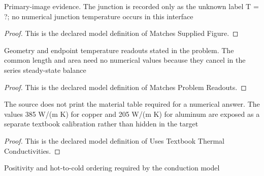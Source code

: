 \begin{definition}
  \label{def:physics:phyx-mini-0488:phyxminiproblems-problemphyxmini0488-matchessuppliedfigure}
  Primary-image evidence. The junction is recorded only as the unknown label T = ?; no numerical junction temperature occurs in this interface
\end{definition}
\begin{proof}
  This is the declared model definition of Matches Supplied Figure.
\end{proof}
\begin{definition}
  \label{def:physics:phyx-mini-0488:phyxminiproblems-problemphyxmini0488-matchesproblemreadouts}
  Geometry and endpoint temperature readouts stated in the problem. The common length and area need no numerical values because they cancel in the series steady-state balance
\end{definition}
\begin{proof}
  This is the declared model definition of Matches Problem Readouts.
\end{proof}
\begin{definition}
  \label{def:physics:phyx-mini-0488:phyxminiproblems-problemphyxmini0488-usestextbookthermalconductivities}
  The source does not print the material table required for a numerical answer. The values 385 W/(m K) for copper and 205 W/(m K) for aluminum are exposed as a separate textbook calibration rather than hidden in the target
\end{definition}
\begin{proof}
  This is the declared model definition of Uses Textbook Thermal Conductivities.
\end{proof}
\begin{definition}
  \label{def:physics:phyx-mini-0488:phyxminiproblems-problemphyxmini0488-hasphysicalcompositerodparameters}
  Positivity and hot-to-cold ordering required by the conduction model
\end{definition}

